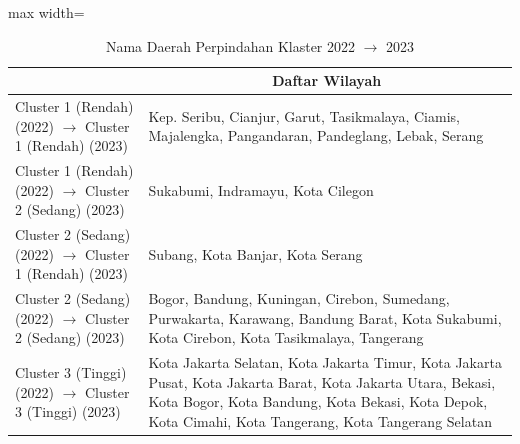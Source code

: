 \begin{table}[H]
\centering
\caption{Nama Daerah Perpindahan Klaster 2022 \(\rightarrow\) 2023} \label{tab:app2transname2022x2023}
\begin{adjustbox}{max width=\textwidth}
\begin{tabular}{|>{\centering\arraybackslash}p{4cm}|p{10cm}|}
\hline
\multicolumn{1}{|c|}{\textbf{Kategori}} & \multicolumn{1}{c|}{\textbf{Daftar Wilayah}} \\
\hline
Cluster 1 (Rendah) (2022) \(\rightarrow\) Cluster 1 (Rendah) (2023) & Kep. Seribu, Cianjur, Garut, Tasikmalaya, Ciamis, Majalengka, Pangandaran, Pandeglang, Lebak, Serang \\
\hline
Cluster 1 (Rendah) (2022) \(\rightarrow\) Cluster 2 (Sedang) (2023) & Sukabumi, Indramayu, Kota Cilegon \\
\hline
Cluster 2 (Sedang) (2022) \(\rightarrow\) Cluster 1 (Rendah) (2023) & Subang, Kota Banjar, Kota Serang \\
\hline
Cluster 2 (Sedang) (2022) \(\rightarrow\) Cluster 2 (Sedang) (2023) & Bogor, Bandung, Kuningan, Cirebon, Sumedang, Purwakarta, Karawang, Bandung Barat, Kota Sukabumi, Kota Cirebon, Kota Tasikmalaya, Tangerang \\
\hline
Cluster 3 (Tinggi) (2022) \(\rightarrow\) Cluster 3 (Tinggi) (2023) & Kota Jakarta Selatan, Kota Jakarta Timur, Kota Jakarta Pusat, Kota Jakarta Barat, Kota Jakarta Utara, Bekasi, Kota Bogor, Kota Bandung, Kota Bekasi, Kota Depok, Kota Cimahi, Kota Tangerang, Kota Tangerang Selatan \\
\hline
\end{tabular}
\end{adjustbox}
\end{table}